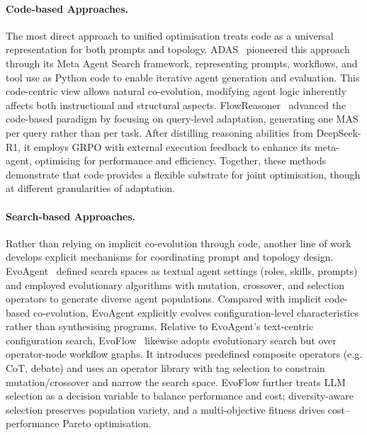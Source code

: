 \documentclass[]{selfevolagent}
\theoremstyle{plain}
\theoremstyle{definition}
\theoremstyle{remark}
\begin{document}
\paragraph{{Code-based Approaches.}}
The most direct approach to unified optimisation treats code as a universal representation for both prompts and topology. ADAS~\citep{hu2025automated} pioneered this approach through its Meta Agent Search framework, representing prompts, workflows, and tool use as Python code to enable iterative agent generation and evaluation. This code-centric view allows natural co-evolution, modifying agent logic inherently affects both instructional and structural aspects. FlowReasoner~\citep{zhang2025evoflowevolvingdiverseagentic} advanced the code-based paradigm by focusing on query-level adaptation, generating one MAS per query rather than per task. After distilling reasoning abilities from DeepSeek-R1, it employs GRPO with external execution feedback to enhance its meta-agent, optimising for performance and efficiency. Together, these methods demonstrate that code provides a flexible substrate for joint optimisation, though at different granularities of adaptation.

\paragraph{{Search-based Approaches.}}
Rather than relying on implicit co-evolution through code, another line of work develops explicit mechanisms for coordinating prompt and topology design. EvoAgent~\citep{yuan-etal-2025-evoagent} defined search spaces as textual agent settings (roles, skills, prompts) and employed evolutionary algorithms with mutation, crossover, and selection operators to generate diverse agent populations. Compared with implicit code\mbox{-}based co\mbox{-}evolution, EvoAgent explicitly evolves configuration\mbox{-}level characteristics rather than synthesising programs.
Relative to EvoAgent’s text-centric configuration search, EvoFlow~\citep{zhang2025evoflowevolvingdiverseagentic} likewise adopts evolutionary search but over operator\mbox{-}node workflow graphs. It introduces predefined composite operators (e.g. CoT, debate) and uses an operator library with tag selection to constrain mutation/crossover and narrow the search space. EvoFlow further treats LLM selection as a decision variable to balance performance and cost; diversity\mbox{-}aware selection preserves population variety, and a multi\mbox{-}objective fitness drives cost–performance Pareto optimisation.
\end{document}

